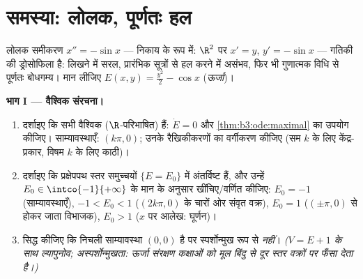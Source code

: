 \section{समस्या: लोलक, पूर्णतः हल}

\begin{problem}\label{pb:b3:ode:1}
लोलक समीकरण $x'' = -\sin x$ --- निकाय के रूप में: $\R^2$ पर $x' =
y$, $y' = -\sin x$ ---
गतिकी की ड्रोसोफिला है: लिखने में सरल, प्रारंभिक सूत्रों से हल
करने में असंभव, फिर भी गुणात्मक विधि से पूर्णतः बोधगम्य। मान
लीजिए $E(x, y) = \frac{y^2}2 - \cos x$ (\emph{ऊर्जा})।

\medskip
\noindent\textbf{भाग I --- वैश्विक संरचना।}
\begin{enumerate}
  \item दर्शाइए कि सभी  वैश्विक ($\R$-परिभाषित) हैं:
        $\dot E = 0$ और \cref{thm:b3:ode:maximal} का उपयोग कीजिए। साम्यावस्थाएँ: $(k\pi, 0)$;
        उनके रैखिकीकरणों का वर्गीकरण कीजिए (सम $k$ के लिए
        केंद्र-प्रकार, विषम $k$ के लिए काठी)।
  \item दर्शाइए कि प्रक्षेपपथ स्तर समुच्चयों $\{E = E_0\}$ में अंतर्विष्ट
        हैं, और उन्हें $E_0 \in \intco{-1}{+\infty}$ के मान के अनुसार खींचिए/वर्णित
        कीजिए: $E_0 = -1$ (साम्यावस्थाएँ), $-1 < E_0 < 1$ ($(2k\pi, 0)$ के चारों ओर
        संवृत वक्र), $E_0 = 1$ ($(\pm\pi, 0)$ से होकर जाता विभाजक), $E_0 > 1$
        ($x$ पर आलेख: घूर्णन)।
  \item सिद्ध कीजिए कि निचली साम्यावस्था $(0,0)$  है पर
        स्पर्शोन्मुख रूप से  \emph{नहीं}। \emph{($V = E + 1$ के
        साथ ल्यापुनोव; अस्पर्शोन्मुखता: ऊर्जा संरक्षण कक्षाओं को
        मूल बिंदु से दूर स्तर वक्रों पर फँसा देता है।)}
\end{enumerate}


\end{problem}
